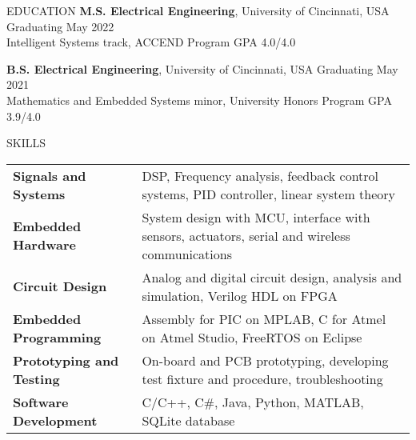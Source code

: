 \documentclass{resume} %
\begin{document}
	


	
	\begin{rSection}{EDUCATION}
		{\bf M.S. Electrical Engineering}, University of Cincinnati, USA \hfill {Graduating May 2022} \\
		Intelligent Systems track, ACCEND Program \hfill GPA 4.0/4.0 \smallskip
		
		{\bf B.S. Electrical Engineering}, University of Cincinnati, USA \hfill {Graduating May 2021}\\
		Mathematics and Embedded Systems minor, University Honors Program \hfill {GPA 3.9/4.0}
		
		
		
		
	\end{rSection}
	
	\begin{rSection}{SKILLS}
		
		\begin{tabular}{ @{} >{\bfseries}l @{\hspace{2ex}} l }
			Signals and Systems & DSP, Frequency analysis, feedback control systems, PID controller, linear system theory	\\
			Embedded Hardware & System design with MCU, interface with sensors, actuators, serial and wireless communications \\ 
			Circuit Design & Analog and digital circuit design, analysis and simulation, Verilog HDL on FPGA \\
			Embedded Programming & Assembly for PIC on MPLAB, C for Atmel on Atmel Studio, FreeRTOS on Eclipse \\
			Prototyping and Testing &  On-board and PCB prototyping, developing test fixture and procedure, troubleshooting	\\
			Software Development & C/C++, C\#, Java, Python, MATLAB, SQLite database \\
		\end{tabular}
	\end{rSection}
	
\end{document}
